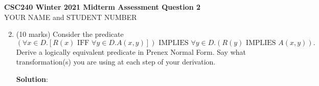\documentclass[11pt]{article}
\newcommand{\Implies}{\mbox{ IMPLIES }}
\newcommand{\Iff}{\mbox{ IFF }}
\begin{document}
\begin{center}
{\bf \Large \bf CSC240 Winter 2021 Midterm Assessment Question 2}\\
YOUR NAME and STUDENT NUMBER
\end{center}

\medskip

\begin{enumerate}
\setcounter{enumi}{1}

\item
\begin{question}
(10 marks)
Consider the predicate
$$(\forall x \in D.[R(x) \Iff \forall y \in D.A(x,y)]) \Implies \forall y \in D. (R(y) \Implies A(x,y)).$$
Derive a logically equivalent predicate in Prenex Normal Form. Say what transformation(s) you are using at each step of your derivation.
\end{question}

\begin{solution}
{\bf Solution}:

\end{solution}
\end{enumerate}
\end{document}
